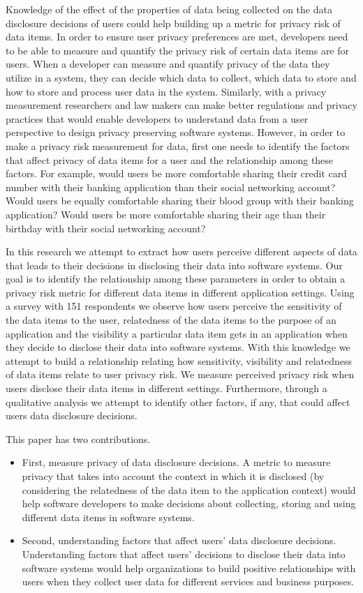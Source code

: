 \documentclass[10pt]{article}
\begin{document}
Knowledge of the effect of the properties of data being collected on the data disclosure decisions of users could help building up a metric for privacy risk of data items. In order to ensure user privacy preferences are met, developers need to be able to measure and quantify the privacy risk of certain data items are for users. When a developer can measure and quantify privacy of the data they utilize in a system, they can decide which data to collect, which data to store and how to store and process user data in the system. Similarly, with a privacy measurement researchers and law makers can make better regulations and privacy practices that would enable developers to understand data from a user perspective to design privacy preserving software systems. However, in order to make a privacy risk measurement for data, first one needs to identify the factors that affect privacy of data items for a user and the relationship among these factors. For example, would users be more comfortable sharing their credit card number with their banking application than their social networking account? Would users be equally comfortable sharing their blood group with their banking application? Would users be more comfortable sharing their age than their birthday with their social networking account? 

In this research we attempt to extract how users perceive different aspects of data that leads to their decisions in disclosing their data into software systems. Our goal is to identify the relationship among these parameters in order to obtain a privacy risk metric for different data items in different application settings. Using a survey with 151 respondents we observe how users perceive the sensitivity of the data items to the user, relatedness of the data items to the purpose of an application and the visibility a particular data item gets in an application when they decide to disclose their data into software systems. With this knowledge we attempt to build a relationship relating how sensitivity, visibility and relatedness of data items relate to user privacy risk. We measure perceived privacy risk when users disclose their data items in different settings. Furthermore, through a qualitative analysis we attempt to identify other factors, if any, that could affect users data disclosure decisions.

This paper has two contributions.

\begin{itemize}
\item  First, measure privacy of data disclosure decisions. A metric to measure privacy that takes into account the context in which it is disclosed (by considering the relatedness of the data item to the application context) would help software developers to make decisions about collecting, storing and using different data items in software systems. 
\item Second, understanding factors that affect users' data disclosure decisions. Understanding factors that affect users' decisions to disclose their data into software systems would help organizations to build positive relationships with users when they collect user data for different services and business purposes. 
\end{itemize}
\end{document}
